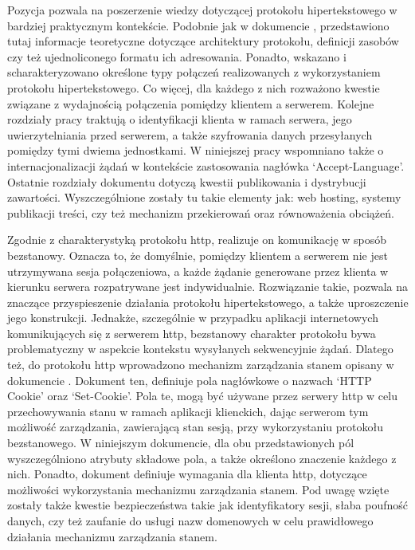 Pozycja \cite{gourley2002http} pozwala na poszerzenie wiedzy dotyczącej protokołu hipertekstowego w bardziej praktycznym kontekście. Podobnie jak w dokumencie \cite{fielding2014hypertext}, przedstawiono tutaj informacje teoretyczne dotyczące architektury protokołu, definicji zasobów czy też ujednoliconego formatu ich adresowania. Ponadto, wskazano i scharakteryzowano określone typy połączeń realizowanych z wykorzystaniem protokołu hipertekstowego. Co więcej, dla każdego z nich rozważono kwestie związane z wydajnością połączenia pomiędzy klientem a serwerem. Kolejne rozdziały pracy \cite{gourley2002http} traktują o identyfikacji klienta w ramach serwera, jego uwierzytelniania przed serwerem, a także szyfrowania danych przesyłanych pomiędzy tymi dwiema jednostkami.  W niniejszej pracy wspomniano także o internacjonalizacji żądań w kontekście zastosowania nagłówka ‘Accept-Language’. Ostatnie rozdziały dokumentu dotyczą kwestii publikowania i dystrybucji zawartości. Wyszczególnione zostały tu takie elementy jak: web hosting, systemy publikacji treści, czy też mechanizm przekierowań oraz równoważenia obciążeń.

Zgodnie z charakterystyką protokołu http, realizuje on komunikację w sposób bezstanowy. Oznacza to, że domyślnie, pomiędzy klientem a serwerem nie jest utrzymywana sesja połączeniowa, a każde żądanie generowane przez klienta w kierunku serwera rozpatrywane jest indywidualnie. Rozwiązanie takie, pozwala na znaczące przyspieszenie działania protokołu hipertekstowego, a także uproszczenie jego konstrukcji. Jednakże, szczególnie w przypadku aplikacji internetowych komunikujących się z serwerem http, bezstanowy charakter protokołu bywa problematyczny w aspekcie kontekstu wysyłanych sekwencyjnie żądań. Dlatego też, do protokołu http wprowadzono mechanizm zarządzania stanem opisany w dokumencie \cite{barth2011rfc}. Dokument ten, definiuje pola nagłówkowe o nazwach ‘HTTP Cookie’ oraz ‘Set-Cookie’. Pola te, mogą być używane przez serwery http w celu przechowywania stanu w ramach aplikacji klienckich, dając serwerom tym możliwość zarządzania, zawierającą stan sesją, przy wykorzystaniu protokołu bezstanowego. W niniejszym dokumencie, dla obu przedstawionych pól wyszczególniono atrybuty składowe pola, a także określono znaczenie każdego z nich. Ponadto, dokument definiuje wymagania dla klienta http, dotyczące możliwości wykorzystania mechanizmu zarządzania stanem. Pod uwagę wzięte zostały także kwestie bezpieczeństwa takie jak identyfikatory sesji, słaba poufność danych, czy też zaufanie do usługi nazw domenowych w celu prawidłowego działania mechanizmu zarządzania stanem.

